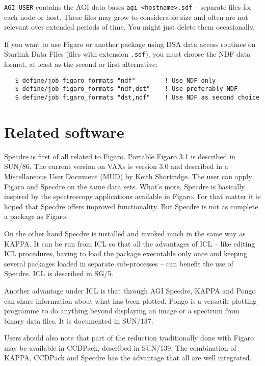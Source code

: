 {\tt AGI\_USER} contains the AGI data bases {\tt agi\_<hostname>.sdf} --
separate files for each node or host. These files may grow to
considerable size and often are not relevant over extended periods of
time.  You might just delete them occasionally.

If you want to use Figaro or another package using DSA data access
routines on Starlink Data Files (files with extension {\tt .sdf}), you
must choose the NDF data format, at least as the second or first
alternative:

\begin{verbatim}
   $ define/job figaro_formats "ndf"        ! Use NDF only
   $ define/job figaro_formats "ndf,dst"    ! Use preferably NDF
   $ define/job figaro_formats "dst,ndf"    ! Use NDF as second choice
\end{verbatim}


\goodbreak
\section{Related software}
\label{related}

Specdre is first of all related to Figaro.  Portable Figaro 3.1 is
described in SUN/86.  The current version on VAXs is version 3.0 and
described in a Miscellaneous User Document (MUD) by Keith Shortridge.
The user can apply Figaro and Specdre on the same data sets. What's
more, Specdre is basically inspired by the spectroscopy applications
available in Figaro. For that matter it is hoped that Specdre offers
improved functionality. But Specdre is not as complete a package as
Figaro.

On the other hand Specdre is installed and invoked much in the same way as
KAPPA. It can be run from ICL so that all the advantages of ICL -- like editing
ICL procedures, having to load the package executable only once and keeping
several packages loaded in separate sub-processes -- can benefit the use of
Specdre. ICL is described in SG/5.

Another advantage under ICL is that through AGI Specdre, KAPPA and Pongo
can share information about what has been plotted.  Pongo is a versatile
plotting programme to do anything beyond displaying an image or a
spectrum from binary data files.  It is documented in SUN/137.

Users should also note that part of the reduction traditionally done with
Figaro may be available in CCDPack, described in SUN/139. The combination of
KAPPA, CCDPack and Specdre has the advantage that all are well integrated.

